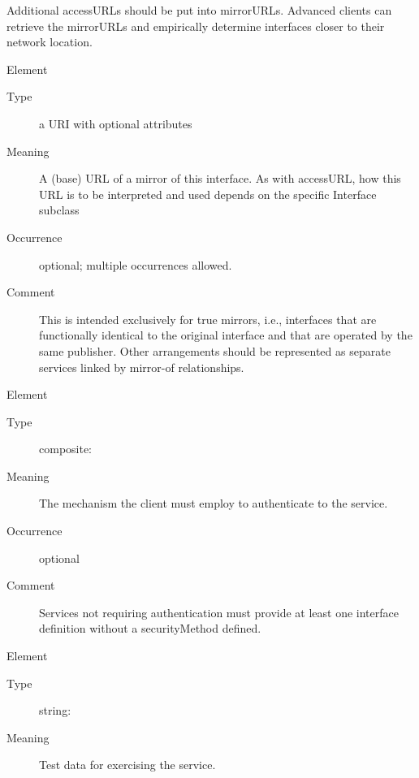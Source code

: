 \documentclass[11pt,a4paper]{ivoa}
\begin{document}
\begin{generated}
\begin{bigdescription}
\begin{description}
                 Additional accessURLs should be put into mirrorURLs.
                 Advanced clients can retrieve the mirrorURLs and
                 empirically determine interfaces closer to their
                 network location.


\end{description}
\item[Element \xmlel{mirrorURL}]
\begin{description}
\item[Type] a URI with optional attributes
\item[Meaning]
                 A (base) URL of a mirror of this interface.  As with
                 accessURL, how this URL is to be interpreted and used
                 depends on the specific Interface subclass

\item[Occurrence] optional; multiple occurrences allowed.
\item[Comment]
                This is intended exclusively for true mirrors, i.e.,
                interfaces that are functionally identical to the
                original interface and that are operated by the same
                publisher.  Other arrangements should be represented as
                separate services linked by mirror-of relationships.


\end{description}
\item[Element \xmlel{securityMethod}]
\begin{description}
\item[Type] composite: 
\item[Meaning]
                  The mechanism the client must employ to authenticate
                  to the service.

\item[Occurrence] optional
\item[Comment]
                  Services not requiring authentication must provide
                  at least one interface definition without a
                  securityMethod defined.


\end{description}
\item[Element \xmlel{testQueryString}]
\begin{description}
\item[Type] string: 
\item[Meaning]
                  Test data for exercising the service.


\end{description}
\end{bigdescription}
\end{generated}
\end{document}

